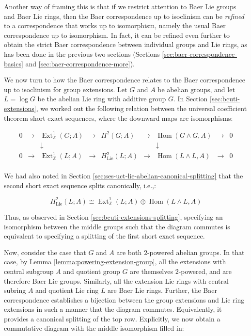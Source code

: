 \documentclass{ucetd}
\begin{document}
Another way of framing this is that if we restrict attention to Baer
Lie groups and Baer Lie rings, then the Baer correspondence up to
isoclinism can be {\em refined} to a correspondence that works up to
isomorphism, namely the usual Baer correspondence up to
isomorphism. In fact, it can be refined even further to obtain the
strict Baer correspondence between individual groups and Lie rings, as
has been done in the previous two sections (Sections
\ref{sec:baer-correspondence-basics} and
\ref{sec:baer-correspondence-more}).

We now turn to how the Baer correspondence relates to the Baer
correspondence up to isoclinism for group extensions. Let $G$ and $A$
be abelian groups, and let $L = \log G$ be the abelian Lie ring with
additive group $G$. In Section \ref{sec:bcuti-extensions}, we worked
out the following relation between the universal coefficient theorem
short exact sequences, where the downward maps are isomorphisms:

$$\begin{array}{ccccccccc}
  0 &\to &\operatorname{Ext}^1_{\mathbb{Z}}(G;A) &\to &H^2(G;A) &\to &\operatorname{Hom}(G \wedge G,A) &\to &0\\
  & & \downarrow & & & & \downarrow & & \\
  0 &\to &\operatorname{Ext}^1_{\mathbb{Z}}(L;A) & \to & H^2_{\text{Lie}}(L;A) & \to & \operatorname{Hom}(L \wedge L, A) & \to & 0\\
\end{array}$$
 
We had also noted in Section
\ref{sec:ses-uct-lie-abelian-canonical-splitting} that the second
short exact sequence splits canonically, i.e.,:

$$H^2_{\text{Lie}}(L;A) \cong \operatorname{Ext}^1_{\mathbb{Z}}(L;A) \oplus \operatorname{Hom}(L \wedge L, A)$$

Thus, as observed in Section \ref{sec:bcuti-extensions-splitting},
specifying an isomorphism between the middle groups such that the
diagram commutes is equivalent to specifying a splitting of the first
short exact sequence.

Now, consider the case that $G$ and $A$ are both $2$-powered abelian
groups. In that case, by Lemma \ref{lemma:powering-extension-group},
all the extensions with central subgroup $A$ and quotient group $G$
are themselves $2$-powered, and are therefore Baer Lie
groups. Similarly, all the extension Lie rings with central subring
$A$ and quotient Lie ring $L$ are Baer Lie rings. Further, the Baer
correspondence establishes a bijection between the group extensions
and Lie ring extensions in such a manner that the diagram
commutes. Equivalently, it provides a canonical splitting of the top
row. Explicitly, we now obtain a commutative diagram with the middle
isomorphism filled in:
\end{document}
